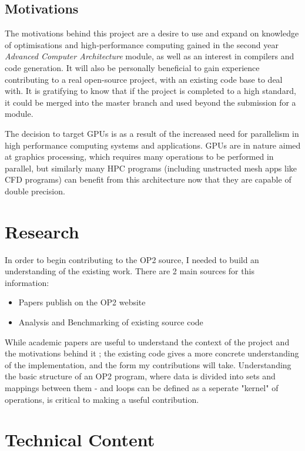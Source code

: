\documentclass[11pt]{article}
\begin{document}
\subsection*{Motivations}
The motivations behind this project are a desire to use and expand on knowledge of optimisations and high-performance computing gained in the second year \textit{Advanced Computer Architecture} module, as well as an interest in compilers and code generation. It will also be personally beneficial to gain experience contributing to a real open-source project, with an existing code base to deal with. It is gratifying to know that if the project is completed to a high standard, it could be merged into the master branch and used beyond the submission for a module.
\par The decision to target GPUs is as a result of the increased need for parallelism in high performance computing systems and applications. GPUs are in nature aimed at graphics processing, which requires many operations to be performed in parallel, but similarly many HPC programs (including unstructed mesh apps like CFD programs) can benefit from this architecture now that they are capable of double precision.
\clearpage
\section*{Research}
In order to begin contributing to the OP2 source, I needed to build an understanding of the existing work. There are 2 main sources for this information:
\begin{itemize}
 \item{Papers publish on the OP2 website}
 \item{Analysis and Benchmarking of existing source code}
\end{itemize}
While academic papers are useful to understand the context of the project and the motivations behind it \cite{op2main} \cite{autoVector} \cite{industrial}; the existing code gives a more concrete understanding of the implementation, and the form my contributions will take. Understanding the basic structure of an OP2 program, where data is divided into sets and mappings between them - and loops can be defined as a seperate "kernel" of operations, is critical to making a useful contribution. 


\section*{Technical Content}
\end{document}
